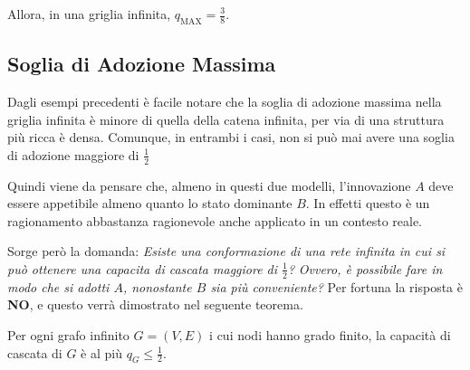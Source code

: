 Allora, in una griglia infinita, $q_{\mathrm{MAX}} = \frac{3}{8}$.

\subsection{Soglia di Adozione Massima}

Dagli esempi precedenti è facile notare che la soglia di adozione massima nella griglia infinita è minore di quella della catena infinita, per via di una struttura più ricca è densa.
Comunque, in entrambi i casi, non si può mai avere una soglia di adozione maggiore di $\frac{1}{2}$

Quindi viene da pensare che, almeno in questi due modelli, l'innovazione $A$ deve essere appetibile almeno quanto lo stato dominante $B$.
In effetti questo è un ragionamento abbastanza ragionevole anche applicato in un contesto reale.

Sorge però la domanda:
\textit{Esiste una conformazione di una rete infinita in cui si può ottenere una capacita di cascata maggiore di $\frac{1}{2}$?}
\textit{Ovvero, è possibile fare in modo che si adotti $A$, nonostante $B$ sia più conveniente?}
Per fortuna la risposta è \textbf{NO}, e questo verrà dimostrato nel seguente teorema.

\begin{teorema}
    Per ogni grafo infinito $G=(V,E)$ i cui nodi hanno grado finito, la capacità di cascata di $G$ è al più $q_G \leq \frac{1}{2}$.
\end{teorema}

